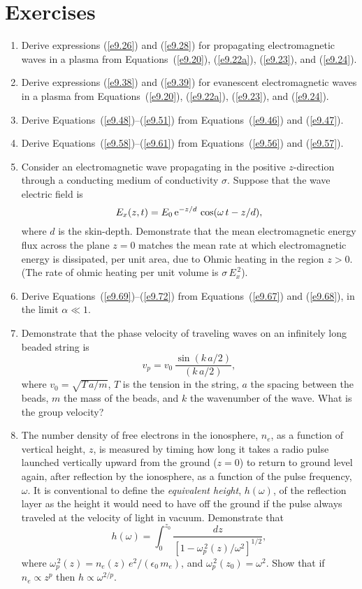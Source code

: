 \section{Exercises}
{\small
\begin{enumerate}
\item Derive expressions (\ref{e9.26}) and (\ref{e9.28}) for propagating  electromagnetic waves in a plasma from Equations~(\ref{e9.20}), (\ref{e9.22a}), (\ref{e9.23}), and (\ref{e9.24}).

\item Derive expressions (\ref{e9.38}) and (\ref{e9.39}) for evanescent electromagnetic
waves in a plasma from Equations~(\ref{e9.20}), (\ref{e9.22a}), (\ref{e9.23}), and (\ref{e9.24}).

\item Derive Equations~(\ref{e9.48})--(\ref{e9.51}) from Equations~(\ref{e9.46}) and
(\ref{e9.47}).

\item Derive Equations~(\ref{e9.58})--(\ref{e9.61}) from Equations~(\ref{e9.56}) and
(\ref{e9.57}).

\item Consider an electromagnetic wave propagating in the positive $z$-direction
through a conducting medium of conductivity $\sigma$. Suppose that the
wave electric field is
$$
E_x(z,t) = E_0\,{\rm e}^{-z/d}\,\cos(\omega\,t-z/d),
$$
where $d$ is the skin-depth. Demonstrate that the mean electromagnetic energy
flux across the plane $z=0$ matches the mean rate at which electromagnetic
energy is dissipated, per unit area, due to Ohmic heating in the region $z>0$. (The rate
of ohmic heating per unit volume is $\sigma\,E_x^{\,2}$).

\item Derive Equations~(\ref{e9.69})--(\ref{e9.72}) from Equations~(\ref{e9.67}) and
(\ref{e9.68}), in the limit $\alpha\ll 1$. 

\item Demonstrate that the phase
velocity of traveling waves on  an infinitely long beaded string is
$$
v_p = v_0\,\frac{\sin(k\,a/2)}{(k\,a/2)},
$$
where $v_0= \sqrt{T\,a/m}$, $T$ is the tension in the string, $a$ the
spacing between the beads, $m$ the mass of the beads, and $k$ the wavenumber
of the wave. What is the group velocity?

\item The number density of free electrons in the ionosphere, $n_e$, as a
function of vertical height, $z$, is measured by timing how long it takes a radio pulse
launched vertically upward from the ground ($z=0$) to return to ground level again, after
reflection by the ionosphere, as a function of the pulse frequency, $\omega$. 
It is conventional to define the {\em equivalent height}, $h(\omega)$, of the reflection layer
as the height it would need to have off the ground if the pulse always traveled
at the velocity of light in vacuum. Demonstrate that
$$
h(\omega) = \int_0^{z_0}\frac{dz}{[1-\omega_p^{\,2}(z)/\omega^2]^{1/2}},
$$
where $\omega_p^{\,2}(z)= n_e(z)\,e^2/(\epsilon_0\,m_e)$, and $\omega_p^{\,2}(z_0)=\omega^2$. Show that if $n_e\propto z^p$ then $h\propto \omega^{2/p}$. 


\end{enumerate}}
